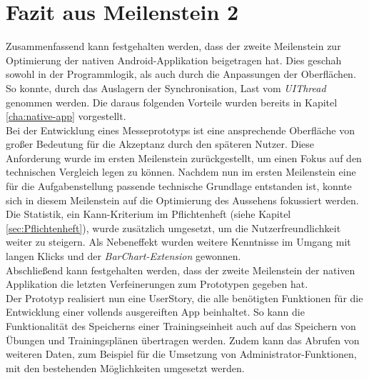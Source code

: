 \section{Fazit aus Meilenstein 2}
\label{sec:fazit-meilenstein-2}
Zusammenfassend kann festgehalten werden, dass der zweite Meilenstein zur Optimierung der nativen Android-Applikation beigetragen hat. Dies geschah sowohl in der Programmlogik, als auch durch die Anpassungen der Oberflächen. \\
So konnte, durch das Auslagern der Synchronisation, Last vom \textit{UIThread} genommen werden. Die daraus folgenden Vorteile wurden bereits in Kapitel \ref{cha:native-app} vorgestellt.\\
Bei der Entwicklung eines Messeprototyps ist eine ansprechende Oberfläche von großer Bedeutung für die Akzeptanz durch den späteren Nutzer. Diese Anforderung wurde im ersten Meilenstein zurückgestellt, um einen Fokus auf den technischen Vergleich legen zu können. Nachdem nun im ersten Meilenstein eine für die Aufgabenstellung passende technische Grundlage entstanden ist, konnte sich in diesem Meilenstein auf die Optimierung des Aussehens fokussiert werden.\\
Die Statistik, ein Kann-Kriterium im Pflichtenheft (siehe Kapitel \ref{sec:Pflichtenheft}), wurde zusätzlich umgesetzt, um die Nutzerfreundlichkeit weiter zu steigern. Als Nebeneffekt wurden weitere Kenntnisse im Umgang mit langen Klicks und der \textit{BarChart-Extension} gewonnen.\\
Abschließend kann festgehalten werden, dass der zweite Meilenstein der nativen Applikation die letzten Verfeinerungen zum Prototypen gegeben hat.\\
Der Prototyp realisiert nun eine \gls{UserStory}, die alle benötigten Funktionen für die Entwicklung einer vollends ausgereiften \gls{App} beinhaltet. So kann die Funktionalität des Speicherns einer Trainingseinheit auch auf das Speichern von Übungen und Trainingsplänen übertragen werden. Zudem kann das Abrufen von weiteren Daten, zum Beispiel für die Umsetzung von Administrator-Funktionen, mit den bestehenden Möglichkeiten umgesetzt werden.

